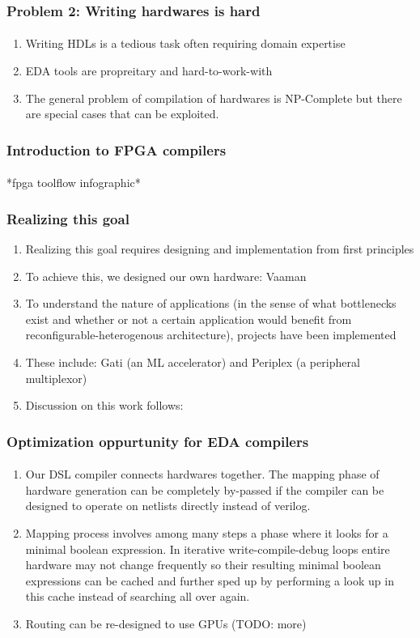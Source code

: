 \documentclass{beamer}
\begin{document}
\begin{frame}[fragile]
  \frametitle{Problem 2: Writing hardwares is hard}
  \framesubtitle{}
  \begin{enumerate}
    \item Writing HDLs is a tedious task often requiring domain expertise
    \item EDA tools are propreitary and hard-to-work-with
    \item The general problem of compilation of hardwares is NP-Complete but
      there are special cases that can be exploited.
  \end{enumerate}
\end{frame}


\begin{frame}[fragile]
  \frametitle{Introduction to FPGA compilers}
  \framesubtitle{}
  *fpga toolflow infographic*
\end{frame}

\begin{frame}[fragile]
  \frametitle{Realizing this goal}
  \begin{enumerate}
    \item Realizing this goal requires designing and implementation from
      first principles
    \item To achieve this, we designed our own hardware: Vaaman
    \item To understand the nature of applications (in the sense of what
      bottlenecks exist and whether or not a certain application would
      benefit from reconfigurable-heterogenous architecture), projects have been implemented
    \item These include: Gati (an ML accelerator) and Periplex (a peripheral
      multiplexor)
    \item Discussion on this work follows:
  \end{enumerate}
  \framesubtitle{}
\end{frame}

\begin{frame}[fragile]
  \frametitle{Optimization oppurtunity for EDA compilers}
  \framesubtitle{}
  \begin{enumerate}
    \item Our DSL compiler connects hardwares together. The mapping phase
      of hardware generation can be completely by-passed if the compiler can
      be designed to operate on netlists directly instead of verilog.
    \item Mapping process involves among many steps a phase where it looks
      for a minimal boolean expression. In iterative write-compile-debug loops
      entire hardware may not change frequently so their resulting minimal
      boolean expressions can be cached and further sped up by performing a
      look up in this cache instead of searching all over again.
    \item Routing can be re-designed to use GPUs (TODO: more)
  \end{enumerate}
\end{frame}
\end{document}
